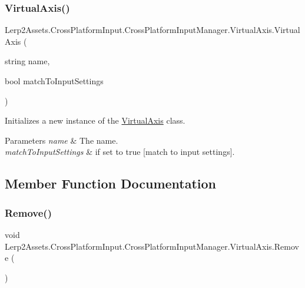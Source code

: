 \subsubsection{\texorpdfstring{Virtual\+Axis()}{VirtualAxis()}\hspace{0.1cm}{\footnotesize\ttfamily [2/2]}}
{\footnotesize\ttfamily Lerp2\+Assets.\+Cross\+Platform\+Input.\+Cross\+Platform\+Input\+Manager.\+Virtual\+Axis.\+Virtual\+Axis (\begin{DoxyParamCaption}\item[{string}]{name,  }\item[{bool}]{match\+To\+Input\+Settings }\end{DoxyParamCaption})\hspace{0.3cm}{\ttfamily [inline]}}



Initializes a new instance of the \hyperlink{class_lerp2_assets_1_1_cross_platform_input_1_1_cross_platform_input_manager_1_1_virtual_axis}{Virtual\+Axis} class. 


\begin{DoxyParams}{Parameters}
{\em name} & The name.\\
\hline
{\em match\+To\+Input\+Settings} & if set to {\ttfamily true} \mbox{[}match to input settings\mbox{]}.\\
\hline
\end{DoxyParams}


\subsection{Member Function Documentation}
\mbox{\label{class_lerp2_assets_1_1_cross_platform_input_1_1_cross_platform_input_manager_1_1_virtual_axis_ab9bb47cd099d82f6dccaf638b7fc0ddf}} 
\subsubsection{\texorpdfstring{Remove()}{Remove()}}
{\footnotesize\ttfamily void Lerp2\+Assets.\+Cross\+Platform\+Input.\+Cross\+Platform\+Input\+Manager.\+Virtual\+Axis.\+Remove (\begin{DoxyParamCaption}{ }\end{DoxyParamCaption})\hspace{0.3cm}{\ttfamily [inline]}}



